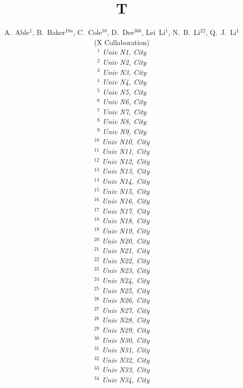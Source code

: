 \documentclass[preprint,11pt]{elsarticle}
\begin{document}
\begin{frontmatter}
\title{T}
\author{
\begin{small}
A.~Able$^{1}$, B.~Baker$^{18a}$, C.~Cole$^{10}$, D.~Dee$^{36b}$, Lei~Li$^{1}$, N.~B.~Li$^{22}$, Q.~J.~Li$^{1}$
\\
\vspace{0.2cm}
(X Collaboration)\\
\vspace{0.2cm} {\it
$^{1}$ Univ N1, City\\
$^{2}$ Univ N2, City\\
$^{3}$ Univ N3, City\\
$^{4}$ Univ N4, City\\
$^{5}$ Univ N5, City\\
$^{6}$ Univ N6, City\\
$^{7}$ Univ N7, City\\
$^{8}$ Univ N8, City\\
$^{9}$ Univ N9, City\\
$^{10}$ Univ N10, City\\
$^{11}$ Univ N11, City\\
$^{12}$ Univ N12, City\\
$^{13}$ Univ N13, City\\
$^{14}$ Univ N14, City\\
$^{15}$ Univ N15, City\\
$^{16}$ Univ N16, City\\
$^{17}$ Univ N17, City\\
$^{18}$ Univ N18, City\\
$^{19}$ Univ N19, City\\
$^{20}$ Univ N20, City\\
$^{21}$ Univ N21, City\\
$^{22}$ Univ N22, City\\
$^{23}$ Univ N23, City\\
$^{24}$ Univ N24, City\\
$^{25}$ Univ N25, City\\
$^{26}$ Univ N26, City\\
$^{27}$ Univ N27, City\\
$^{28}$ Univ N28, City\\
$^{29}$ Univ N29, City\\
$^{30}$ Univ N30, City\\
$^{31}$ Univ N31, City\\
$^{32}$ Univ N32, City\\
$^{33}$ Univ N33, City\\
$^{34}$ Univ N34, City\\
}
\end{small}}
\end{frontmatter}
\end{document}
